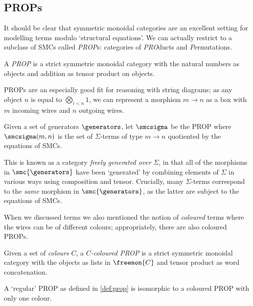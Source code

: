 \subsection{PROPs}

It should be clear that symmetric monoidal categories are an excellent setting
for modelling terms modulo `structural equations'.
We can actually restrict to a subclass of SMCs called \emph{PROP}s: categories
of \emph{PRO}ducts and \emph{P}ermutations.

\begin{definition}\label{def:prop}
    A \emph{PROP} is a strict symmetric monoidal category with the
    natural numbers as objects and addition as tensor product on objects.
\end{definition}

PROPs are an especially good fit for reasoning with string diagrams; as any
object \(n\) is equal to \(\bigotimes_{i < n} 1\), we can represent a morphism
\(m \to n\) as a box with \(m\) incoming wires and \(n\) outgoing wires.

\begin{definition}\label{def:freely-generated-prop}
    Given a set of generators \(\generators\), let \(\smcsigma\) be the
    PROP where \(\smcsigma(m, n)\) is the set of \(\Sigma\)-terms of type
    \(m \to n\) quotiented by the equations of SMCs.
\end{definition}

This is known as a category \emph{freely generated over} \(\Sigma\), in that all
of the morphisms in \(\smc{\generators}\) have been `generated' by combining
elements of \(\Sigma\) in various ways using composition and tensor.
Crucially, many \(\Sigma\)-terms correspond to the \emph{same} morphism in
\(\smc{\generators}\), as the latter are subject to the equations of SMCs.

When we discussed terms we also mentioned the notion of \emph{coloured} terms
where the wires can be of different colours; appropriately, there are also
coloured PROPs.

\begin{definition}
    Given a set of \emph{colours} \(C\), a \emph{\(C\)-coloured PROP} is a strict
    symmetric monoidal category with the objects as lists in \(\freemon{C}\) and
    tensor product as word concatenation.
\end{definition}

\begin{remark}
    A `regular' PROP as defined in \cref{def:prop} is isomorphic to a
    coloured PROP with only one colour.
\end{remark}

